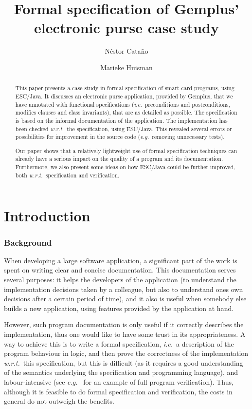 \documentclass[a4paper]{llncs}
\title{Formal specification of Gemplus' electronic purse case study}
\author{
  N\'estor Cata\~no
\and
  Marieke Huisman
}
\institute{
  INRIA Sophia-Antipolis, France \\ 
  \email{\{Nestor.Catano, Marieke.Huisman\}@sophia.inria.fr}
}
\begin{document}
%

\maketitle


\begin{abstract}
This paper presents a case study in formal specification of smart card
programs, using ESC/Java. It discusses an electronic purse
application, provided by Gemplus, that we have annotated with
functional specifications (\emph{i.e.}~preconditions and
postconditions, modifies
clauses and class invariants), that are as detailed as possible. The
specification is based on the informal documentation of the
application. The implementation has been checked \emph{w.r.t.}~the
specification, using ESC/Java.  This revealed several errors or
possibilities for improvement in the source code (\emph{e.g.}~removing
unnecessary tests).

Our paper shows that a relatively
lightweight use of formal specification techniques can already have
a serious impact on the quality of a program and its
documentation. Furthermore, we also present some ideas on how ESC/Java
could be further improved, both
\emph{w.r.t.}~specification and verification.
\end{abstract}

\section{Introduction}
\label{SectIntro}

\subsubsection{Background}
When developing a large software application, a significant part of
the work is spent on writing clear and concise documentation. This
documentation serves several purposes: it helps the developers of the
application (to understand the implementation decisions taken by a
colleague, but also to understand ones own decisions after a certain
period of time), and it also is useful when somebody else builds a new
application, using features provided by the application at hand.

However, such program documentation is only useful if it correctly
describes the implementation, thus one would like to have some trust
in its appropriateness. A way to achieve this is to write a formal
specification, \emph{i.e.}~a description of the program behaviour in
logic, and then prove the correctness of the implementation
\emph{w.r.t.}~this specification, but this is difficult (as it
requires a good understanding of the semantics underlying the
specification and programming language), and labour-intensive (see
\emph{e.g.}~\cite{HuismanJB00a} for an example of full program
verification). Thus, although it is feasible to do formal
specification and verification, the costs in general do not outweigh
the benefits.
\end{document}
